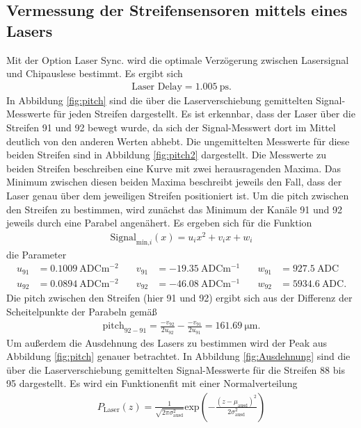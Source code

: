 \subsection{Vermessung der Streifensensoren mittels eines Lasers}

Mit der Option Laser Sync. wird die optimale Verzögerung zwischen Lasersignal und
Chipauslese bestimmt. Es ergibt sich
\begin{align}
  \text{Laser Delay} = \SI{1.005}{\pico\second}.
\end{align}
In Abbildung \ref{fig:pitch} sind die über die Laserverschiebung gemittelten Signal-Messwerte für jeden Streifen
dargestellt. Es ist erkennbar, dass der Laser über die Streifen 91 und 92 bewegt wurde,
da sich der Signal-Messwert dort im Mittel deutlich von den anderen Werten abhebt.
Die ungemittelten Messwerte für diese beiden Streifen sind in Abbildung \ref{fig:pitch2} dargestellt.
Die Messwerte zu beiden Streifen beschreiben eine Kurve mit zwei herausragenden Maxima.
Das Minimum zwischen diesen beiden Maxima beschreibt jeweils den Fall, dass der Laser genau über dem jeweiligen
Streifen positioniert ist. Um die pitch zwischen den Streifen zu bestimmen, wird zunächst das Minimum der Kanäle 91 und 92
jeweils durch eine Parabel angenähert. Es ergeben sich für die Funktion
\begin{align}
  \text{Signal}_{\text{min,}i}(x) = u_i x^2 + v_i x + w_i
\end{align}
die Parameter
\begin{align*}
  u_{91} &= \SI{0.1009}{\text{ADC}\meter\tothe{-2}} &\quad v_{91} &= \SI{-19.35}{\text{ADC}\meter\tothe{-1}} &\quad w_{91} &= \SI{927.5}{\text{ADC}} \\
  u_{92} &= \SI{0.0894}{\text{ADC}\meter\tothe{-2}} &\quad v_{92} &= \SI{-46.08}{\text{ADC}\meter\tothe{-1}} &\quad w_{92} &= \SI{5934.6}{\text{ADC}}.
\end{align*}
Die pitch zwischen den Streifen (hier 91 und 92) ergibt sich aus der Differenz der Scheitelpunkte der Parabeln gemäß
\begin{align}
  \text{pitch}_{92-91} = \frac{-v_{92}}{2u_{92}} - \frac{-v_{91}}{2u_{91}} = \SI{161.69}{\micro\meter}.
\end{align}
Um außerdem die Ausdehnung des Lasers zu bestimmen wird der Peak aus Abbildung \ref{fig:pitch} genauer betrachtet.
In Abbildung \ref{fig:Ausdehnung} sind die über die Laserverschiebung gemittelten Signal-Messwerte für die Streifen
88 bis 95 dargestellt. Es wird ein Funktionenfit mit einer Normalverteilung
\begin{align}
  P_\text{Laser}(z) = \frac{1}{\sqrt{2 \pi \sigma_\text{ausd}^2}} \text{exp}\left(-\frac{(z-\mu_\text{ausd})^2}{2\sigma_\text{ausd}^2}\right)
\end{align}
